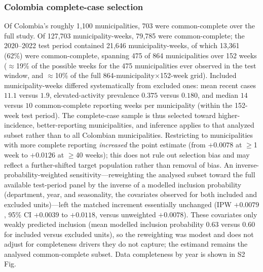 \documentclass[11pt,a4paper]{article}
\begin{document}
\subsubsection*{Colombia complete-case selection}
Of Colombia's roughly 1{,}100 municipalities, 703 were common-complete over the full study. Of 127{,}703 municipality-weeks, 79{,}785 were common-complete; the 2020--2022 test period contained 21{,}646 municipality-weeks, of which 13{,}361 (62\%) were common-complete, spanning 475 of 864 municipalities over 152 weeks ($\approx$19\% of the possible weeks for the 475 municipalities ever observed in the test window, and $\approx$10\% of the full 864-municipality$\times$152-week grid). Included municipality-weeks differed systematically from excluded ones: mean recent cases $11.1$ versus $1.9$, elevated-activity prevalence $0.375$ versus $0.180$, and median $14$ versus $10$ common-complete reporting weeks per municipality (within the 152-week test period). The complete-case sample is thus selected toward higher-incidence, better-reporting municipalities, and inference applies to that analyzed subset rather than to all Colombian municipalities. Restricting to municipalities with more complete reporting \emph{increased} the point estimate (from $+0.0078$ at $\geq$1 week to $+0.0126$ at $\geq$40 weeks); this does not rule out selection bias and may reflect a further-shifted target population rather than removal of bias. An inverse-probability-weighted sensitivity---reweighting the analysed subset toward the full available test-period panel by the inverse of a modelled inclusion probability (department, year, and seasonality, the covariates observed for both included and excluded units)---left the matched increment essentially unchanged (IPW $+0.0079$, 95\% CI $+0.0039$ to $+0.0118$, versus unweighted $+0.0078$). These covariates only weakly predicted inclusion (mean modelled inclusion probability $0.63$ versus $0.60$ for included versus excluded units), so the reweighting was modest and does not adjust for completeness drivers they do not capture; the estimand remains the analysed common-complete subset. Data completeness by year is shown in S2 Fig.
\end{document}
